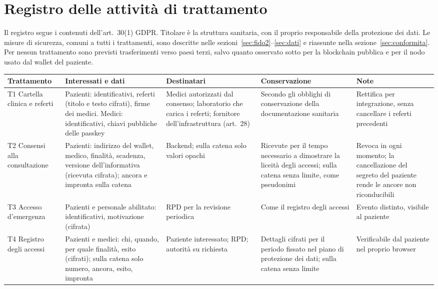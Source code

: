 \section{Registro delle attività di trattamento}\label{app:registro}

Il registro segue i contenuti dell'art.~30(1) GDPR. Titolare è la struttura sanitaria, con il proprio responsabile della protezione dei dati. Le misure di sicurezza, comuni a tutti i trattamenti, sono descritte nelle sezioni~\ref{sec:fido2}--\ref{sec:dati} e riassunte nella sezione~\ref{sec:conformita}. Per nessun trattamento sono previsti trasferimenti verso paesi terzi, salvo quanto osservato sotto per la blockchain pubblica e per il nodo usato dal wallet del paziente.

\begin{table}[H]
\centering\scriptsize
\renewcommand{\arraystretch}{1.25}
\begin{tabular}{@{}p{} p{} p{} p{} p{}@{}}
\toprule
Trattamento & Interessati e dati & Destinatari & Conservazione & Note\\
\midrule
T1 Cartella clinica e referti & Pazienti: identificativi, referti (titolo e testo cifrati), firme dei medici. Medici: identificativi, chiavi pubbliche delle passkey & Medici autorizzati dal consenso; laboratorio che carica i referti; fornitore dell'infrastruttura (art.~28) & Secondo gli obblighi di conservazione della documentazione sanitaria & Rettifica per integrazione, senza cancellare i referti precedenti\\
T2 Consensi alla consultazione & Pazienti: indirizzo del wallet, medico, finalità, scadenza, versione dell'informativa (ricevuta cifrata); ancora e impronta sulla catena & Backend; sulla catena solo valori opachi & Ricevute per il tempo necessario a dimostrare la liceità degli accessi; sulla catena senza limite, come pseudonimi & Revoca in ogni momento; la cancellazione del segreto del paziente rende le ancore non riconducibili\\
T3 Accesso d'emergenza & Pazienti e personale abilitato: identificativi, motivazione (cifrata) & RPD per la revisione periodica & Come il registro degli accessi & Evento distinto, visibile al paziente\\
T4 Registro degli accessi & Pazienti e medici: chi, quando, per quale finalità, esito (cifrati); sulla catena solo numero, ancora, esito, impronta & Paziente interessato; RPD; autorità su richiesta & Dettagli cifrati per il periodo fissato nel piano di protezione dei dati; sulla catena senza limite & Verificabile dal paziente nel proprio browser\\

\end{tabular}
\end{table}
